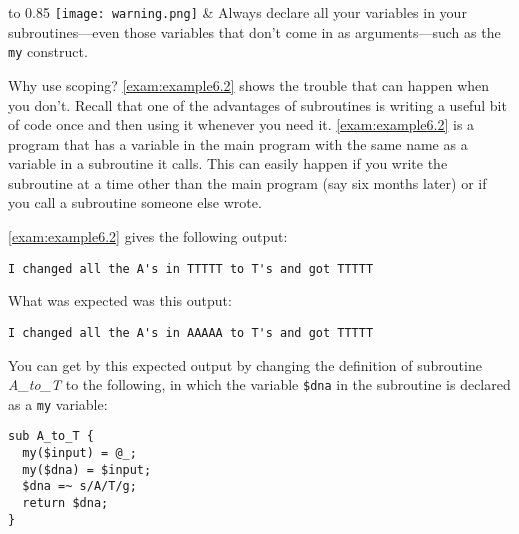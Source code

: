 \vspace{-5pt}
\begin{table}[h]
  \begin{center}
    \begin{tabu*} to 0.85\linewidth {|X[1,r,m]X[15,l,m]|}
      \tabucline{-}
      \texttt{[image: warning.png]} & Always declare all your variables in your subroutines—even those variables that don't come in as arguments—such as the \verb|my| construct.\\
      \tabucline{-}
    \end{tabu*}
  \end{center}
\end{table}
\vspace{-20pt}

Why use scoping? \autoref{exam:example6.2} shows the trouble that can happen when you don't. Recall that one of the advantages of subroutines is writing a useful bit of code once and then using it whenever you need it. \autoref{exam:example6.2} is a program that has a variable in the main program with the same name as a variable in a subroutine it calls. This can easily happen if you write the subroutine at a time other than the main program (say six months later) or if you call a subroutine someone else wrote. 



\autoref{exam:example6.2} gives the following output:

\begin{lstlisting}
I changed all the A's in TTTTT to T's and got TTTTT 
\end{lstlisting}

What was expected was this output:

\begin{lstlisting}
I changed all the A's in AAAAA to T's and got TTTTT 
\end{lstlisting}

You can get by this expected output by changing the definition of subroutine \textit{A\_to\_T} to the following, in which the variable \verb|$dna| in the subroutine is declared as a \verb|my| variable: 

\begin{lstlisting}
sub A_to_T {
  my($input) = @_;
  my($dna) = $input;
  $dna =~ s/A/T/g;
  return $dna;
}
\end{lstlisting}

